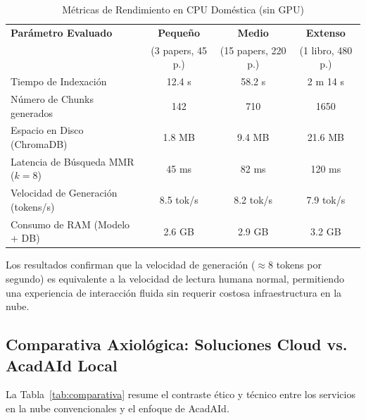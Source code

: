 \documentclass[12pt,a4paper]{article}
\begin{document}
\begin{table}[htbp]
\centering
\caption{Métricas de Rendimiento en CPU Doméstica (sin GPU)}
\label{tab:desempeno}
\small
\begin{tabularx}{\linewidth}{>{\raggedright\arraybackslash}X ccc}
\toprule
\textbf{Parámetro Evaluado} & \textbf{Pequeño} & \textbf{Medio} & \textbf{Extenso} \\
 & (3 papers, 45 p.) & (15 papers, 220 p.) & (1 libro, 480 p.) \\
\midrule
Tiempo de Indexación & 12.4 s & 58.2 s & 2 m 14 s \\
Número de Chunks generados & 142 & 710 & 1650 \\
Espacio en Disco (ChromaDB) & 1.8 MB & 9.4 MB & 21.6 MB \\
Latencia de Búsqueda MMR ($k=8$) & 45 ms & 82 ms & 120 ms \\
Velocidad de Generación (tokens/s) & 8.5 tok/s & 8.2 tok/s & 7.9 tok/s \\
Consumo de RAM (Modelo + DB) & 2.6 GB & 2.9 GB & 3.2 GB \\
\bottomrule
\end{tabularx}
\end{table}

Los resultados confirman que la velocidad de generación ($\approx 8$ tokens por segundo) es equivalente a la velocidad de lectura humana normal, permitiendo una experiencia de interacción fluida sin requerir costosa infraestructura en la nube.

\subsection{Comparativa Axiológica: Soluciones Cloud vs. AcadAId Local}
La Tabla~\ref{tab:comparativa} resume el contraste ético y técnico entre los servicios en la nube convencionales y el enfoque de AcadAId.
\end{document}
